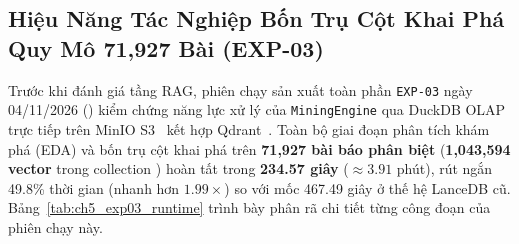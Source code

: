 \subsection{Hiệu Năng Tác Nghiệp Bốn Trụ Cột Khai Phá Quy Mô 71,927 Bài (EXP-03)}
\label{sec:ch5_exp03_mining}

Trước khi đánh giá tầng RAG, phiên chạy sản xuất toàn phần \texttt{EXP-03} ngày 04/11/2026 () kiểm chứng năng lực xử lý của \texttt{MiningEngine} qua DuckDB OLAP trực tiếp trên MinIO S3~\cite{raasveldt2019duckdb,minio2023storage} kết hợp Qdrant~\cite{qdrant2023vector}. Toàn bộ giai đoạn phân tích khám phá (EDA) và bốn trụ cột khai phá trên \textbf{71,927 bài báo phân biệt} (\textbf{1,043,594 vector} trong collection ) hoàn tất trong \textbf{234.57 giây} ($\approx 3.91$ phút), rút ngắn 49.8\% thời gian (nhanh hơn $1.99\times$) so với mốc 467.49 giây ở thế hệ LanceDB cũ. Bảng~\ref{tab:ch5_exp03_runtime} trình bày phân rã chi tiết từng công đoạn của phiên chạy này.

